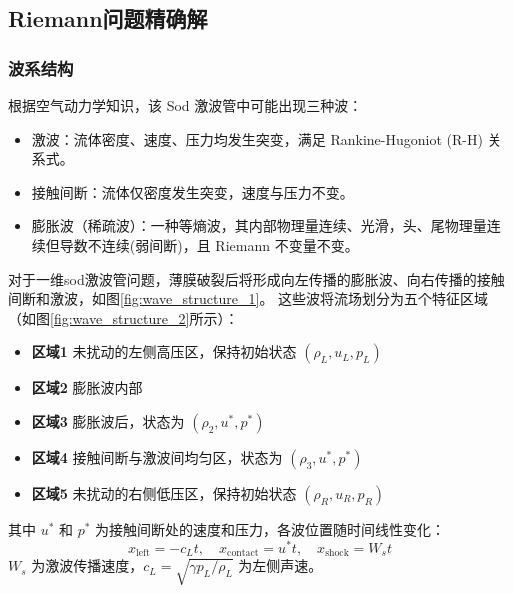 \documentclass[UTF8]{ctexart}
\begin{document}
\subsection{Riemann问题精确解}
\subsubsection{波系结构}
根据空气动力学知识，该 Sod 激波管中可能出现三种波：
\begin{itemize}
    \item 激波：流体密度、速度、压力均发生突变，满足 Rankine-Hugoniot (R-H) 关系式。
    \item 接触间断：流体仅密度发生突变，速度与压力不变。
    \item 膨胀波（稀疏波）：一种等熵波，其内部物理量连续、光滑，头、尾物理量连续但导数不连续(弱间断)，且 Riemann 不变量不变。
\end{itemize}
对于一维sod激波管问题，薄膜破裂后将形成向左传播的膨胀波、向右传播的接触间断和激波，如图\ref{fig:wave_structure_1}。
这些波将流场划分为五个特征区域（如图\ref{fig:wave_structure_2}所示）：
\begin{itemize}
    \item \textbf{区域1} 未扰动的左侧高压区，保持初始状态 $(\rho_L, u_L, p_L)$
    \item \textbf{区域2} 膨胀波内部
    \item \textbf{区域3} 膨胀波后，状态为 $(\rho_2, u^*, p^*)$
    \item \textbf{区域4} 接触间断与激波间均匀区，状态为 $(\rho_3, u^*, p^*)$
    \item \textbf{区域5} 未扰动的右侧低压区，保持初始状态 $(\rho_R, u_R, p_R)$
\end{itemize}

其中 $u^*$ 和 $p^*$ 为接触间断处的速度和压力，各波位置随时间线性变化：
$$x_{\text{left}} = -c_L t, \quad x_{\text{contact}} = u^* t, \quad x_{\text{shock}} = W_s t$$
$W_s$ 为激波传播速度，$c_L = \sqrt{\gamma p_L/\rho_L}$ 为左侧声速。
\end{document}
